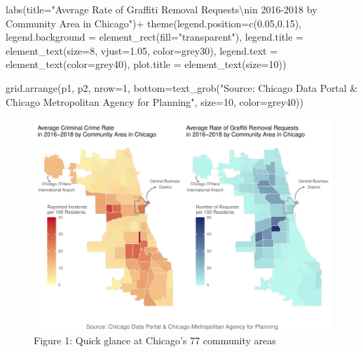 \documentclass[
]{report}
\newenvironment{Shaded}{}{}
\newcommand{\AttributeTok}[1]{\textcolor[rgb]{0.84,0.23,0.29}{#1}}
\newcommand{\DecValTok}[1]{\textcolor[rgb]{0.00,0.36,0.77}{#1}}
\newcommand{\FloatTok}[1]{\textcolor[rgb]{0.00,0.36,0.77}{#1}}
\newcommand{\FunctionTok}[1]{\textcolor[rgb]{0.44,0.26,0.76}{#1}}
\newcommand{\NormalTok}[1]{\textcolor[rgb]{0.14,0.16,0.18}{#1}}
\newcommand{\SpecialCharTok}[1]{\textcolor[rgb]{0.00,0.36,0.77}{#1}}
\newcommand{\StringTok}[1]{\textcolor[rgb]{0.01,0.18,0.38}{#1}}
\begin{document}
\begin{Shaded}
\begin{Highlighting}[]
  \FunctionTok{labs}\NormalTok{(}\AttributeTok{title=}\StringTok{"Average Rate of Graffiti Removal Requests}\SpecialCharTok{\textbackslash{}n}\StringTok{in 2016{-}2018 by Community Area in Chicago"}\NormalTok{)}\SpecialCharTok{+}
  \FunctionTok{theme}\NormalTok{(}\AttributeTok{legend.position=}\FunctionTok{c}\NormalTok{(}\FloatTok{0.05}\NormalTok{,}\FloatTok{0.15}\NormalTok{), }
        \AttributeTok{legend.background =} \FunctionTok{element\_rect}\NormalTok{(}\AttributeTok{fill=}\StringTok{"transparent"}\NormalTok{),}
        \AttributeTok{legend.title =} \FunctionTok{element\_text}\NormalTok{(}\AttributeTok{size=}\DecValTok{8}\NormalTok{, }\AttributeTok{vjust=}\FloatTok{1.05}\NormalTok{, }\AttributeTok{color=}\StringTok{\textquotesingle{}grey30\textquotesingle{}}\NormalTok{),}
        \AttributeTok{legend.text =} \FunctionTok{element\_text}\NormalTok{(}\AttributeTok{color=}\StringTok{\textquotesingle{}grey40\textquotesingle{}}\NormalTok{),}
        \AttributeTok{plot.title =} \FunctionTok{element\_text}\NormalTok{(}\AttributeTok{size=}\DecValTok{10}\NormalTok{))}


\FunctionTok{grid.arrange}\NormalTok{(p1, p2, }\AttributeTok{nrow=}\DecValTok{1}\NormalTok{,}
             \AttributeTok{bottom=}\FunctionTok{text\_grob}\NormalTok{(}\StringTok{"Source: Chicago Data Portal \& Chicago Metropolitan Agency for Planning"}\NormalTok{, }\AttributeTok{size=}\DecValTok{10}\NormalTok{, }\AttributeTok{color=}\StringTok{\textquotesingle{}grey40\textquotesingle{}}\NormalTok{))}
\end{Highlighting}
\end{Shaded}

\begin{figure}[H]

\caption{Figure 1: Quick glance at Chicago's 77 community areas}

{\centering \includegraphics{final_solo_files/figure-pdf/unnamed-chunk-2-1.pdf}

}

\end{figure}
\end{document}
